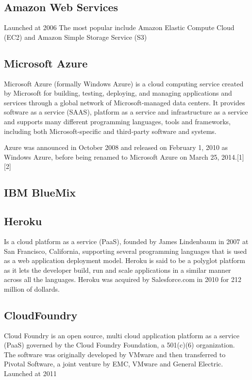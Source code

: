 \subsection{Amazon Web Services}
Launched at 2006
The most popular include Amazon Elastic Compute Cloud (EC2) and Amazon Simple Storage Service (S3)

\subsection{Microsoft Azure}
Microsoft Azure (formally Windows Azure)  is a cloud computing service created by Microsoft for building, testing, deploying, and managing applications and services through a global network of Microsoft-managed data centers. It provides software as a service (SAAS), platform as a service and infrastructure as a service and supports many different programming languages, tools and frameworks, including both Microsoft-specific and third-party software and systems.

Azure was announced in October 2008 and released on February 1, 2010 as Windows Azure, before being renamed to Microsoft Azure on March 25, 2014.[1][2]
\subsection{IBM BlueMix}

\subsection{Heroku}
 Is a cloud platform as a service (PaaS), founded by James Lindenbaum in 2007 at
 San Francisco, California, supporting several programming languages that is used
 as a web application deployment model.
 Heroku is said to be a polyglot platform as it lets the developer build,
 run and scale applications in a similar manner across all the languages.
 Heroku was acquired by Salesforce.com in 2010 for 212 million of dollards.

\subsection{CloudFoundry}
Cloud Foundry is an open source, multi cloud application platform as a service
(PaaS) governed by the Cloud Foundry Foundation, a 501(c)(6) organization.
The software was originally developed by VMware and then transferred to Pivotal Software, a joint venture by EMC, VMware and General Electric.
Launched at 2011

